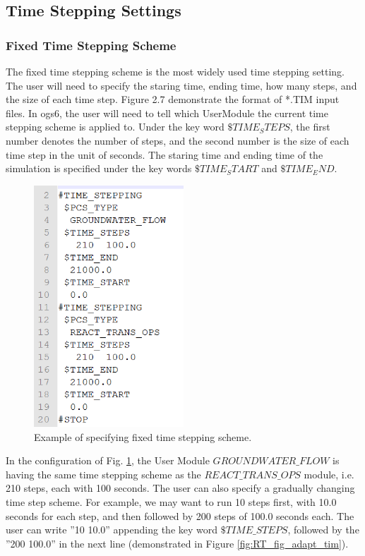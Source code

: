 \subsection{Time Stepping Settings}

\subsubsection{Fixed Time Stepping Scheme}

The fixed time stepping scheme is the most widely used time stepping setting. The user will need to specify the staring time, ending time, how many steps, and the size of each time step. Figure 2.7 demonstrate the format of *.TIM input files. In ogs6, the user will need to tell which UserModule the current time stepping scheme is applied to. Under the key word $\$TIME_STEPS$, the first number denotes the number of steps, and the second number is the size of each time step in the unit of seconds. The staring time and ending time of the simulation is specified under the key words $\$TIME_START$ and $\$TIME_END$. 

\begin{figure}
\includegraphics[width=0.5\textwidth]{RT/figs/RT_fig_fixed_tim}
\caption{Example of specifying fixed time stepping scheme. }
\label{fig:RT_fig_fixed_tim}
\end{figure}

In the configuration of Fig. \ref{fig:RT_fig_fixed_tim}, the User Module $GROUNDWATER\_FLOW$ is having the same time stepping scheme as the $REACT\_TRANS\_OPS$ module, i.e. 210 steps, each with 100 seconds. The user can also specify a gradually changing time step scheme. For example, we may want to run 10 steps first, with 10.0 seconds for each step, and then followed by 200 steps of 100.0 seconds each. The user can write ''10   10.0'' appending the key word $\$TIME\_STEPS$, followed by the ''200 100.0'' in the next line (demonstrated in Figure \ref{fig:RT_fig_adapt_tim}). 

